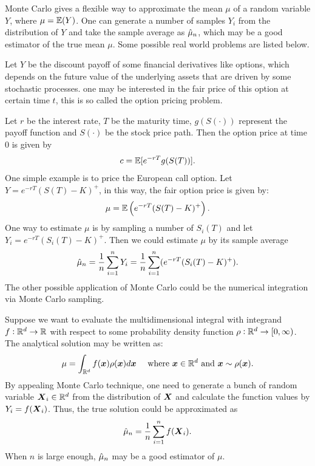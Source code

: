 \documentclass{iitthesis}
\theoremstyle{definition}
\begin{document}

Monte Carlo gives a flexible way to approximate the mean $\mu$ of a random variable $Y$, where $\mu=\mathbb{E}(Y)$. One can generate a number of samples $Y_i$ from the distribution of $Y$ and take the sample average as $\hat{\mu}_n$, which may be a good estimator of the true mean $\mu$. Some possible real world problems are listed below. 

Let $Y$ be the discount payoff of some financial derivatives like options, which depends on the future value of the underlying assets that are driven by some stochastic processes. one may be interested in the fair price of this option at certain time $t$, this is so called the option pricing problem. 

Let $r$ be the interest rate, $T$ be the maturity time, $g(S(\cdot))$ represent the payoff function and $S(\cdot)$ be the stock price path. Then the option price at time $0$ is given by $$c=\mathbb{E}[e^{-rT}g(S(T))].$$ One simple example is to price the European call option. Let $Y = e^{-rT}(S(T)-K)^+ $, in this way, the fair option price is given by:
$$\mu = \mathbb{E}\left(e^{-rT}(S(T)-K)^+\right).$$
One way to estimate $\mu$ is by sampling a number of $S_i(T)$ and let $Y_i = e^{-rT}(S_i(T)-K)^+$. Then we could estimate $\mu$ by its sample average
$$\hat{\mu}_n = \frac1n\sum_{i=1}^n Y_i =\frac1n \sum_{i=1}^n( e^{-rT}(S_i(T)-K)^+).$$
The other possible application of Monte Carlo could be the numerical integration via Monte Carlo sampling.

Suppose we want to evaluate the multidimensional integral with integrand $f:\mathbb{R}^d \to \mathbb{R}$ with respect to some probability density function $\rho: \mathbb{R}^d \to [0,\infty)$.
The analytical solution may be written as:
$$\mu = \int_{\mathbb{R}^d}f(\boldsymbol{x})\rho(\boldsymbol{x})d\boldsymbol{x} \quad \text{   where } \boldsymbol{x} \in \mathbb{R}^d \text{ and } \boldsymbol{x} \sim \rho(\boldsymbol{x}).$$
By appealing Monte Carlo technique, one need to generate a bunch of random variable $\boldsymbol{X}_i \in \mathbb{R}^d$ from the distribution of $\boldsymbol{X}$ and calculate the function values by $Y_i = f(\boldsymbol{X}_i)$. Thus, the true solution could be approximated as $$\hat{\mu}_n = \frac1n\sum_{i=1}^n f(\boldsymbol{X}_i).$$
When $n$ is large enough, $\hat{\mu}_n$ may be a good estimator of $\mu$.
\end{document}
